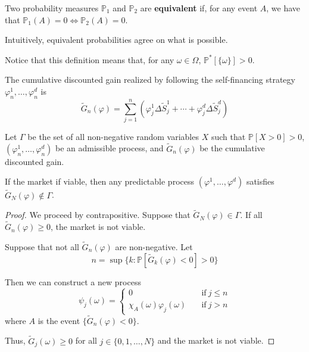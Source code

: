 \begin{definition}
    Two probability measures $\mathbb{P}_1$ and $\mathbb{P}_2$ are \textbf{equivalent} if, for any event $A$, we have that $\mathbb{P}_1(A) = 0 \iff \mathbb{P}_2(A) = 0$.
\end{definition}

Intuitively, equivalent probabilities agree on what is possible.

Notice that this definition means that, for any $\omega \in \Omega$, $\mathbb{P}^\ast[\{\omega\}] > 0$.

\begin{definition}
    The cumulative discounted gain realized by following the self-financing strategy $\varphi_n^1, \ldots, \varphi_n^d$ is 
    \[
        \tilde{G}_n(\varphi) = \sum_{j=1}^{n} \left( \varphi_j^1 \Delta \tilde{S}_j^1 + \cdots + \varphi_j^d \Delta \tilde{S}_j^d \right)
    \]
\end{definition}

\begin{lemma}\label{lm:1.2.7}
    Let $\Gamma$ be the set of all non-negative random variables $X$ such that $\mathbb{P}[X > 0] > 0$, $(\varphi_n^1, \ldots, \varphi_n^d)$ be an admissible process, and $\tilde{G}_n(\varphi)$ be the cumulative discounted gain.
    
    If the market if viable, then any predictable process $(\varphi^1, \ldots, \varphi^d)$ satisfies $\tilde{G}_N(\varphi) \notin \Gamma$.
\end{lemma}
    
\begin{proof}
    We proceed by contrapositive. Suppose that $\tilde{G}_N(\varphi) \in \Gamma$. If all $\tilde{G}_n(\varphi) \ge 0$, the market is not viable. 

    Suppose that not all $\tilde{G}_n(\varphi)$ are non-negative. Let
    \[
        n = \sup \{ k : \mathbb{P}[\tilde{G}_k(\varphi) < 0] > 0 \}
    \]

    Then we can construct a new process 
    \begin{equation*}
        \psi_j(\omega) = \begin{cases}
            0 & \quad \text{if} ~j \le n \\
            \chi_A(\omega) \varphi_j(\omega) & \quad \text{if} ~j > n
        \end{cases}
    \end{equation*}
    where $A$ is the event $\{ \tilde{G}_n(\varphi) < 0 \}$.

    Thus, $\tilde{G}_j(\omega) \geq 0$ for all $j \in \{ 0, 1, \ldots, N \}$ and the market is not viable.
\end{proof}

